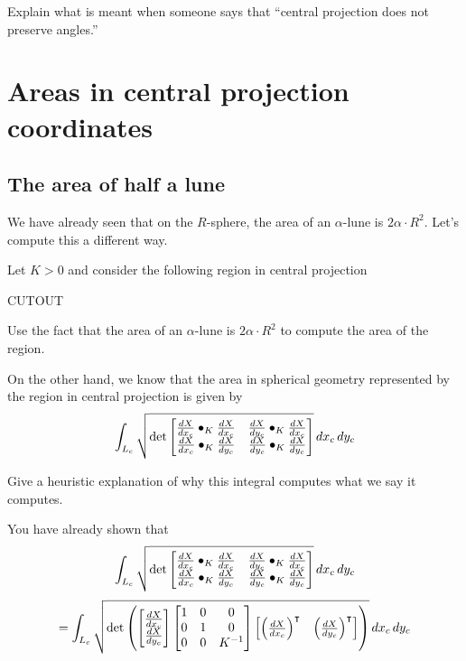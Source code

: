 \documentclass{ximera}
\begin{document}
\begin{problem}
  Explain what is meant when someone says that ``central projection
  does not preserve angles.''
\end{problem}


\section{Areas in central projection coordinates}

\subsection{The area of half a lune}

We have already seen that on the $R$-sphere, the area of an
$\alpha$-lune is $2\alpha\cdot R^2$. Let's compute this a different
way.

\begin{problem}
  Let $K>0$ and consider the following region in central projection
 \begin{image}
   CUTOUT
 \end{image}
 Use the fact that the area of an $\alpha$-lune is $2\alpha\cdot R^2$
 to compute the area of the region.
\end{problem}

On the other hand, we know that the area in spherical geometry
represented by the region in central projection is given by
\[
\int_{L_c} \sqrt{
  \det
  \begin{bmatrix}
    \dd[X]{x_c}\bullet_K \dd[X]{x_c} & \dd[X]{y_c}\bullet_K \dd[X]{x_c} \\
    \dd[X]{x_c}\bullet_K \dd[X]{y_c} & \dd[X]{y_c}\bullet_K \dd[X]{y_c}
  \end{bmatrix}
}\d x_c\d y_c
\]

\begin{problem}
  Give a heuristic explanation of why this integral computes what we
  say it computes.
\end{problem}

You have already shown that
\[
\int_{L_c} \sqrt{
  \det
  \begin{bmatrix}
    \dd[X]{x_c}\bullet_K \dd[X]{x_c} & \dd[X]{y_c}\bullet_K \dd[X]{x_c} \\
    \dd[X]{x_c}\bullet_K \dd[X]{y_c} & \dd[X]{y_c}\bullet_K \dd[X]{y_c}
  \end{bmatrix}
}\d x_c\d y_c
\]
\[
=
\int_{L_c} \sqrt{
  \det\left(
  \begin{bmatrix}
    \dd[X]{x_c}\\
    \dd[X]{y_c}
  \end{bmatrix}
  \begin{bmatrix}
    1 & 0 & 0\\
    0 & 1 & 0\\
    0 & 0 & K^{-1}
  \end{bmatrix}
  \begin{bmatrix}
    \left(\dd[X]{x_c}\right)^\transpose & \left(\dd[X]{y_c}\right)^\transpose
  \end{bmatrix}\right)
}\d x_c\d y_c
\]
\end{document}
